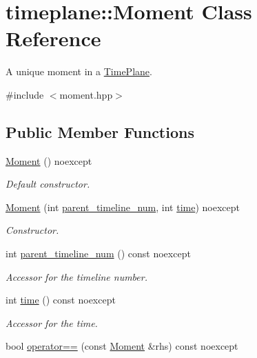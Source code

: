 \hypertarget{classtimeplane_1_1_moment}{}\section{timeplane\+:\+:Moment Class Reference}
\label{classtimeplane_1_1_moment}


A unique moment in a {\ttfamily \hyperlink{classtimeplane_1_1_time_plane}{Time\+Plane}}.  




{\ttfamily \#include $<$moment.\+hpp$>$}

\subsection*{Public Member Functions}
\begin{DoxyCompactItemize}
\item 
\hyperlink{classtimeplane_1_1_moment_a5eecc085ee6010fa5079ddea4e79d6cb}{Moment} () noexcept
\begin{DoxyCompactList}\small\item\em Default constructor. \end{DoxyCompactList}\item 
\hyperlink{classtimeplane_1_1_moment_a33106530bbe889016479d1443d592571}{Moment} (int \hyperlink{classtimeplane_1_1_moment_ad8ea04fc7e079694a0843ff7b3f42c6c}{parent\+\_\+timeline\+\_\+num}, int \hyperlink{classtimeplane_1_1_moment_a118be8757aa459d4d6e4d859a5164251}{time}) noexcept
\begin{DoxyCompactList}\small\item\em Constructor. \end{DoxyCompactList}\item 
int \hyperlink{classtimeplane_1_1_moment_ad8ea04fc7e079694a0843ff7b3f42c6c}{parent\+\_\+timeline\+\_\+num} () const noexcept
\begin{DoxyCompactList}\small\item\em Accessor for the timeline number. \end{DoxyCompactList}\item 
int \hyperlink{classtimeplane_1_1_moment_a118be8757aa459d4d6e4d859a5164251}{time} () const noexcept
\begin{DoxyCompactList}\small\item\em Accessor for the time. \end{DoxyCompactList}\item 
bool \hyperlink{classtimeplane_1_1_moment_abe69bf9b6e324f3147c9f1ed078b9d0c}{operator==} (const \hyperlink{classtimeplane_1_1_moment}{Moment} \&rhs) const noexcept

\end{DoxyCompactItemize}
